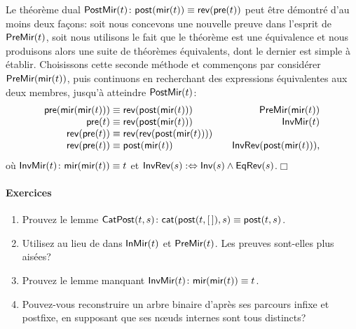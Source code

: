 Le théorème dual \(\textsf{PostMir}({t})
\colon \textsf{post}(\textsf{mir}(t)) \equiv
\textsf{rev}(\textsf{pre}(t))\)
 
 peut être démontré d'au moins deux façons:
soit nous concevons une nouvelle preuve dans l'esprit de
\(\textsf{PreMir}({t})\), soit nous utilisons le fait que le théorème est
une équivalence et nous produisons alors une suite de théorèmes
équivalents, dont le dernier est simple à établir. Choisissons cette
seconde méthode et commençons par considérer
\(\textsf{PreMir}({\textsf{mir}(t)})\),
puis continuons en recherchant des expressions équivalentes aux deux
membres, jusqu'à atteindre \(\textsf{PostMir}({t})\):
\begin{equation*}
\abovedisplayskip=0pt
\belowdisplayskip=0pt
\begin{array}{@{}r@{\;}c@{\;}l@{\qquad}r@{}}
          \fun{pre}(\fun{mir}(\fun{mir}(t)))
& \equiv
& \fun{rev}(\fun{post}(\fun{mir}(t)))
& \IH{\pred{PreMir}{\fun{mir}(t)}}\\
  \fun{pre}(t)
& \equiv
& \fun{rev}(\fun{post}(\fun{mir}(t)))
& \IH{\pred{InvMir}{t}}\\
  \fun{rev}(\fun{pre}(t))
& \equiv
& \fun{rev}(\fun{rev}(\fun{post}(\fun{mir}(t))))\\
  \fun{rev}(\fun{pre}(t))
& \equiv
& \fun{post}(\fun{mir}(t))
& \IH{\pred{InvRev}{\fun{post}(\fun{mir}(t))}},
\end{array}
\end{equation*}
où \(\textsf{InvMir}({t}) \colon
\textsf{mir}(\textsf{mir}(t)) \equiv t\) et
\(\textsf{InvRev}({s}) :\Leftrightarrow \textsf{Inv}({s}) \wedge
\textsf{EqRev}({s})\).\hfill\(\Box\)

\paragraph{Exercices}
\nopagebreak
\begin{enumerate}

  \item Prouvez le lemme
  \(\textsf{CatPost}({t,s}) \colon \textsf{cat}(\textsf{post}(t,[\,]),s) \equiv
  \textsf{post}(t,s)\).

  \item Utilisez  au lieu de  dans
  \(\textsf{InMir}({t})\) et \(\textsf{PreMir}({t})\). Les preuves sont-elles
  plus aisées?

  \item Prouvez le lemme manquant
  \(\textsf{InvMir}({t}) \colon \textsf{mir}(\textsf{mir}(t)) \equiv
  t\).\label{ex_mir_mir}

\item Pouvez-vous reconstruire un arbre binaire d'après ses parcours
  infixe et postfixe, en supposant que ses nœuds internes sont
  tous distincts?

\end{enumerate}

